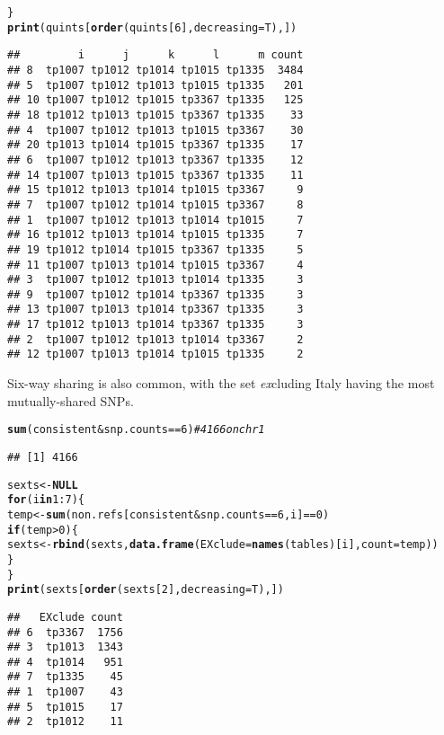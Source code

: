 \documentclass{article}\usepackage[]{graphicx}\usepackage[]{color}
\makeatletter
\newcommand{\hlnum}[1]{\textcolor[rgb]{0.686,0.059,0.569}{#1}}%
\newcommand{\hlcom}[1]{\textcolor[rgb]{0.678,0.584,0.686}{\textit{#1}}}%
\newcommand{\hlopt}[1]{\textcolor[rgb]{0,0,0}{#1}}%
\newcommand{\hlstd}[1]{\textcolor[rgb]{0.345,0.345,0.345}{#1}}%
\newcommand{\hlkwa}[1]{\textcolor[rgb]{0.161,0.373,0.58}{\textbf{#1}}}%
\newcommand{\hlkwb}[1]{\textcolor[rgb]{0.69,0.353,0.396}{#1}}%
\newcommand{\hlkwc}[1]{\textcolor[rgb]{0.333,0.667,0.333}{#1}}%
\newcommand{\hlkwd}[1]{\textcolor[rgb]{0.737,0.353,0.396}{\textbf{#1}}}%
\newenvironment{kframe}{%
 \def\at@end@of@kframe{}%
 \ifinner\ifhmode%
  \def\at@end@of@kframe{\end{minipage}}%
  \begin{minipage}{\columnwidth}%
 \fi\fi%
 \def\FrameCommand##1{\hskip\@totalleftmargin \hskip-\fboxsep
 \colorbox{shadecolor}{##1}\hskip-\fboxsep
     \hskip-\linewidth \hskip-\@totalleftmargin \hskip\columnwidth}%
 \MakeFramed {\advance\hsize-\width
   \@totalleftmargin\z@ \linewidth\hsize
   \@setminipage}}%
 {\par\unskip\endMakeFramed%
 \at@end@of@kframe}
\newenvironment{knitrout}{}{} %
\makeatother
\begin{document}
\begin{knitrout}
\begin{kframe}
\begin{alltt}
\hlstd{\}}
\hlkwd{print}\hlstd{(quints[}\hlkwd{order}\hlstd{(quints[}\hlnum{6}\hlstd{],} \hlkwc{decreasing} \hlstd{= T), ])}
\end{alltt}
\begin{verbatim}
##         i      j      k      l      m count
## 8  tp1007 tp1012 tp1014 tp1015 tp1335  3484
## 5  tp1007 tp1012 tp1013 tp1015 tp1335   201
## 10 tp1007 tp1012 tp1015 tp3367 tp1335   125
## 18 tp1012 tp1013 tp1015 tp3367 tp1335    33
## 4  tp1007 tp1012 tp1013 tp1015 tp3367    30
## 20 tp1013 tp1014 tp1015 tp3367 tp1335    17
## 6  tp1007 tp1012 tp1013 tp3367 tp1335    12
## 14 tp1007 tp1013 tp1015 tp3367 tp1335    11
## 15 tp1012 tp1013 tp1014 tp1015 tp3367     9
## 7  tp1007 tp1012 tp1014 tp1015 tp3367     8
## 1  tp1007 tp1012 tp1013 tp1014 tp1015     7
## 16 tp1012 tp1013 tp1014 tp1015 tp1335     7
## 19 tp1012 tp1014 tp1015 tp3367 tp1335     5
## 11 tp1007 tp1013 tp1014 tp1015 tp3367     4
## 3  tp1007 tp1012 tp1013 tp1014 tp1335     3
## 9  tp1007 tp1012 tp1014 tp3367 tp1335     3
## 13 tp1007 tp1013 tp1014 tp3367 tp1335     3
## 17 tp1012 tp1013 tp1014 tp3367 tp1335     3
## 2  tp1007 tp1012 tp1013 tp1014 tp3367     2
## 12 tp1007 tp1013 tp1014 tp1015 tp1335     2
\end{verbatim}
\end{kframe}
\end{knitrout}


Six-way sharing is also common, with the set \emph{ex}cluding Italy having the most mutually-shared SNPs.  
\begin{knitrout}\small
{}\color{fgcolor}\begin{kframe}
\begin{alltt}
\hlkwd{sum}\hlstd{(consistent} \hlopt{&} \hlstd{snp.counts} \hlopt{==} \hlnum{6}\hlstd{)}  \hlcom{# 4166 on chr1}
\end{alltt}
\begin{verbatim}
## [1] 4166
\end{verbatim}
\begin{alltt}
\hlstd{sexts} \hlkwb{<-} \hlkwa{NULL}
\hlkwa{for} \hlstd{(i} \hlkwa{in} \hlnum{1}\hlopt{:}\hlnum{7}\hlstd{) \{}
    \hlstd{temp} \hlkwb{<-} \hlkwd{sum}\hlstd{(non.refs[consistent} \hlopt{&} \hlstd{snp.counts} \hlopt{==} \hlnum{6}\hlstd{, i]} \hlopt{==} \hlnum{0}\hlstd{)}
    \hlkwa{if} \hlstd{(temp} \hlopt{>} \hlnum{0}\hlstd{) \{}
        \hlstd{sexts} \hlkwb{<-} \hlkwd{rbind}\hlstd{(sexts,} \hlkwd{data.frame}\hlstd{(}\hlkwc{EXclude} \hlstd{=} \hlkwd{names}\hlstd{(tables)[i],} \hlkwc{count} \hlstd{= temp))}
    \hlstd{\}}
\hlstd{\}}
\hlkwd{print}\hlstd{(sexts[}\hlkwd{order}\hlstd{(sexts[}\hlnum{2}\hlstd{],} \hlkwc{decreasing} \hlstd{= T), ])}
\end{alltt}
\begin{verbatim}
##   EXclude count
## 6  tp3367  1756
## 3  tp1013  1343
## 4  tp1014   951
## 7  tp1335    45
## 1  tp1007    43
## 5  tp1015    17
## 2  tp1012    11
\end{verbatim}
\end{kframe}
\end{knitrout}
\end{document}
